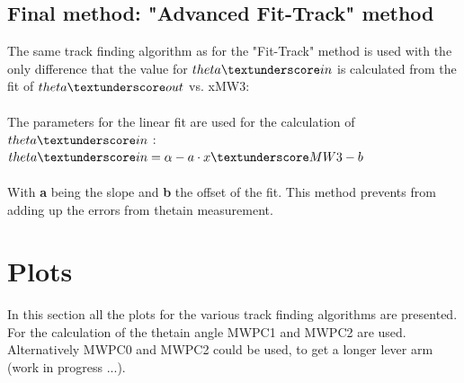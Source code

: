 \documentclass[12pt, letterpaper]{article}
\begin{document}
\subsection{Final method: "Advanced Fit-Track" method}
The same track finding algorithm as for the "Fit-Track" method is used with the only difference that the value for $theta\textunderscore in$ is calculated from the fit of $theta\textunderscore out$ vs. xMW3:\\
\\
The parameters for the linear fit are used for the calculation of $theta\textunderscore in$ :\\

$theta\textunderscore in = \alpha - a \cdot x\textunderscore MW3 - b$ \\
\\
With \textbf{a} being the slope and \textbf{b} the offset of the fit. This method prevents from adding up the errors from theta\textunderscore in measurement.

\section{Plots}
In this section all the plots for the various track finding algorithms are presented. For the calculation of the theta\textunderscore in angle MWPC1 and MWPC2 are used. Alternatively MWPC0 and MWPC2 could be used, to get a longer lever arm (work in progress ...).\\
\end{document}
